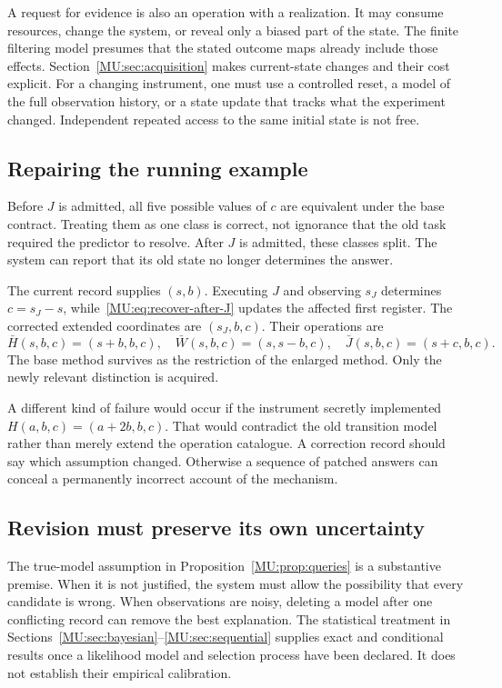 A request for evidence is also an operation with a realization. It may consume resources, change the system, or reveal only a biased part of the state. The finite filtering model presumes that the stated outcome maps already include those effects. Section~\ref{MU:sec:acquisition} makes current-state changes and their cost explicit. For a changing instrument, one must use a controlled reset, a model of the full observation history, or a state update that tracks what the experiment changed. Independent repeated access to the same initial state is not free.

\subsection{Repairing the running example}
Before $J$ is admitted, all five possible values of $c$ are equivalent under the base contract. Treating them as one class is correct, not ignorance that the old task required the predictor to resolve. After $J$ is admitted, these classes split. The system can report that its old state no longer determines the answer.

The current record supplies $(s,b)$. Executing $J$ and observing $s_J$ determines $c=s_J-s$, while~\eqref{MU:eq:recover-after-J} updates the affected first register. The corrected extended coordinates are $(s_J,b,c)$. Their operations are
\[
\bar H(s,b,c)=(s+b,b,c),\quad
\bar W(s,b,c)=(s,s-b,c),\quad
\bar J(s,b,c)=(s+c,b,c).
\]
The base method survives as the restriction of the enlarged method. Only the newly relevant distinction is acquired.

A different kind of failure would occur if the instrument secretly implemented $H(a,b,c)=(a+2b,b,c)$. That would contradict the old transition model rather than merely extend the operation catalogue. A correction record should say which assumption changed. Otherwise a sequence of patched answers can conceal a permanently incorrect account of the mechanism.

\subsection{Revision must preserve its own uncertainty}
The true-model assumption in Proposition~\ref{MU:prop:queries} is a substantive premise. When it is not justified, the system must allow the possibility that every candidate is wrong. When observations are noisy, deleting a model after one conflicting record can remove the best explanation. The statistical treatment in Sections~\ref{MU:sec:bayesian}--\ref{MU:sec:sequential} supplies exact and conditional results once a likelihood model and selection process have been declared. It does not establish their empirical calibration.

